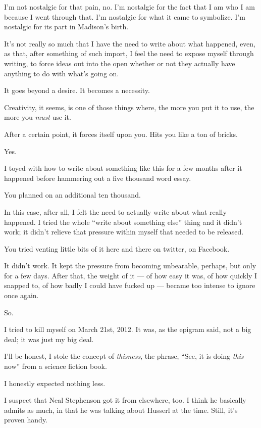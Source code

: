 \begin{paracol}{2}
\begin{leftcolumn}
I'm not nostalgic for that pain, no. I'm nostalgic for the fact that I am who I am because I went through that. I'm nostalgic for what it came to symbolize. I'm nostalgic for its part in Madison's birth.
\newpage

\noindent It's not really so much that I have the need to write about what happened, even, as that, after something of such import, I feel the need to expose myself through writing, to force ideas out into the open whether or not they actually have anything to do with what's going on.

\begin{ally}
It goes beyond a desire. It becomes a necessity.
\end{ally}
Creativity, it seems, is one of those things where, the more you put it to use, the more you \emph{must} use it.

\begin{ally}
After a certain point, it forces itself upon you. Hits you like a ton of bricks.
\end{ally}
Yes.

I toyed with how to write about something like this for a few months after it happened before hammering out a five thousand word essay.

\begin{ally}
You planned on an additional ten thousand.
\end{ally}
In this case, after all, I felt the need to actually write about what really happened. I tried the whole ``write about something else'' thing and it didn't work; it didn't relieve that pressure within myself that needed to be released.

\begin{ally}
You tried venting little bits of it here and there on twitter, on Facebook.
\end{ally}
It didn't work. It kept the pressure from becoming unbearable, perhaps, but only for a few days. After that, the weight of it --- of how easy it was, of how quickly I snapped to, of how badly I could have fucked up --- became too intense to ignore once again.

So.

I tried to kill myself on March 21st, 2012. It was, as the epigram said, not a big deal; it was just my big deal.
\newpage

\noindent I'll be honest, I stole the concept of \emph{thisness}, the phrase, ``See, it is doing \emph{this} now'' from a science fiction book.

\begin{ally}
I honestly expected nothing less.
\end{ally}
I suspect that Neal Stephenson got it from elsewhere, too. I think he basically admits as much, in that he was talking about Husserl at the time. Still, it's proven handy.


\end{leftcolumn}
\end{paracol}
